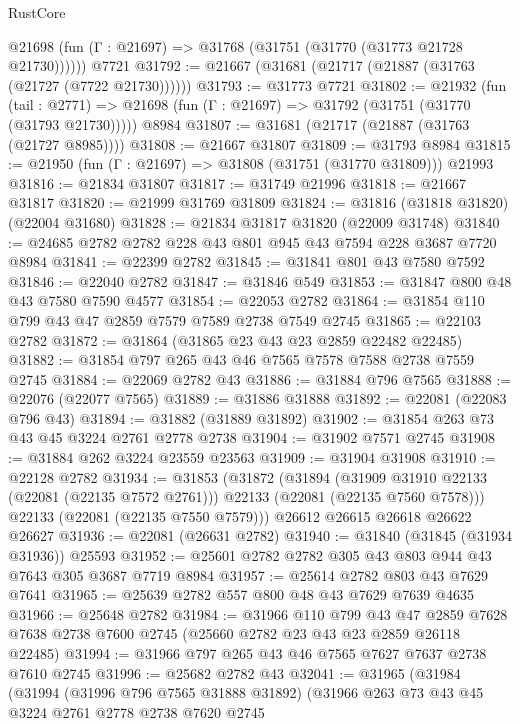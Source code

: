 \begin{lexlean}{RustCore}
\begin{coremodule}
      @21698 (fun (Γ : @21697) => @31768 (@31751 (@31770 (@31773 @21728 @21730))))))
    @7721
@31792 := @21667 (@31681 (@21717 (@21887 (@31763 (@21727 (@7722 @21730))))))
@31793 := @31773 @7721
@31802 := @21932
    (fun (tail : @2771) => @21698 (fun (Γ : @21697) => @31792 (@31751 (@31770 (@31793 @21730)))))
    @8984
@31807 := @31681 (@21717 (@21887 (@31763 (@21727 @8985))))
@31808 := @21667 @31807
@31809 := @31793 @8984
@31815 := @21950 (fun (Γ : @21697) => @31808 (@31751 (@31770 @31809))) @21993
@31816 := @21834 @31807
@31817 := @31749 @21996
@31818 := @21667 @31817
@31820 := @21999 @31769 @31809
@31824 := @31816 (@31818 @31820) (@22004 @31680)
@31828 := @21834 @31817 @31820 (@22009 @31748)
@31840 := @24685 @2782 @2782 @228 @43 @801 @945 @43 @7594 @228 @3687 @7720 @8984
@31841 := @22399 @2782
@31845 := @31841 @801 @43 @7580 @7592
@31846 := @22040 @2782
@31847 := @31846 @549
@31853 := @31847 @800 @48 @43 @7580 @7590 @4577
@31854 := @22053 @2782
@31864 := @31854 @110 @799 @43 @47 @2859 @7579 @7589 @2738 @7549 @2745
@31865 := @22103 @2782
@31872 := @31864 (@31865 @23 @43 @23 @2859 @22482 @22485)
@31882 := @31854 @797 @265 @43 @46 @7565 @7578 @7588 @2738 @7559 @2745
@31884 := @22069 @2782 @43
@31886 := @31884 @796 @7565
@31888 := @22076 (@22077 @7565)
@31889 := @31886 @31888
@31892 := @22081 (@22083 @796 @43)
@31894 := @31882 (@31889 @31892)
@31902 := @31854 @263 @73 @43 @45 @3224 @2761 @2778 @2738
@31904 := @31902 @7571 @2745
@31908 := @31884 @262 @3224 @23559 @23563
@31909 := @31904 @31908
@31910 := @22128 @2782
@31934 := @31853
    (@31872
      (@31894
        (@31909 @31910 @22133 (@22081 (@22135 @7572 @2761)))
        @22133
        (@22081 (@22135 @7560 @7578)))
      @22133
      (@22081 (@22135 @7550 @7579)))
    @26612
    @26615
    @26618
    @26622
    @26627
@31936 := @22081 (@26631 @2782)
@31940 := @31840 (@31845 (@31934 @31936)) @25593
@31952 := @25601 @2782 @2782 @305 @43 @803 @944 @43 @7643 @305 @3687 @7719 @8984
@31957 := @25614 @2782 @803 @43 @7629 @7641
@31965 := @25639 @2782 @557 @800 @48 @43 @7629 @7639 @4635
@31966 := @25648 @2782
@31984 := @31966
    @110
    @799
    @43
    @47
    @2859
    @7628
    @7638
    @2738
    @7600
    @2745
    (@25660 @2782 @23 @43 @23 @2859 @26118 @22485)
@31994 := @31966 @797 @265 @43 @46 @7565 @7627 @7637 @2738 @7610 @2745
@31996 := @25682 @2782 @43
@32041 := @31965
    (@31984
      (@31994
        (@31996 @796 @7565 @31888 @31892)
        (@31966
          @263
          @73
          @43
          @45
          @3224
          @2761
          @2778
          @2738
          @7620
          @2745

\end{coremodule}
\end{lexlean}
